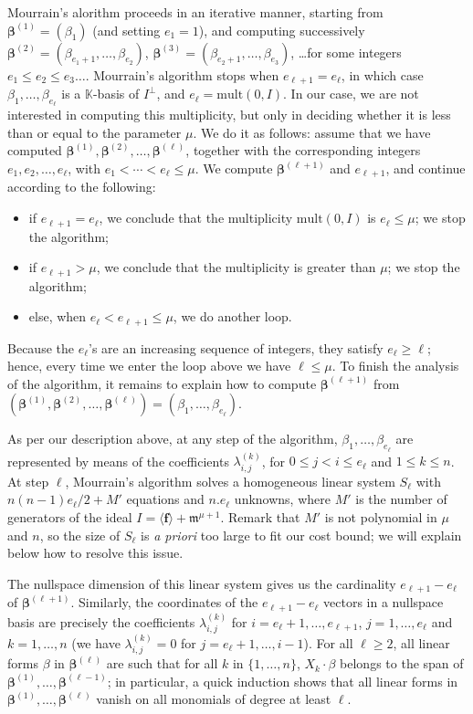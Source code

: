 \documentclass[11pt]{article}
\numberwithin{Property}{section}
\numberwithin{Theorem}{section}
\numberwithin{Proposition}{section}
\numberwithin{Lemma}{section}
\numberwithin{Corollary}{section}
\numberwithin{Definition}{section}
\numberwithin{Remark}{section}
\numberwithin{Conjecture}{section}
\numberwithin{Problem}{section}
\numberwithin{Claim}{section}
\theoremstyle{definition}
\numberwithin{Example}{section}
\def\mult{\ensuremath{\mathrm{mult}}}
\renewcommand{\le}{\leqslant}
\renewcommand{\ge}{\geqslant}
\renewcommand{\ge}{\geqslant} %
\renewcommand{\le}{\leqslant} %
\newcommand{\field}{\mathbb{K}} %
\begin{document}
Mourrain's alorithm proceeds in an iterative manner, starting from $\bm{\beta}^{(1)}=(\beta_{1})$ (and setting $e_1=1$), and computing successively $\bm{\beta}^{(2)}=(\beta_{e_1+1},\dots,\beta_{e_2})$, $\bm{\beta}^{(3)}=(\beta_{e_2+1},\dots,\beta_{e_3})$, \dots for some integers $e_1 \le e_2 \le e_3 \dots$. Mourrain's algorithm stops when $e_{\ell+1}=e_{\ell}$, in which case $\beta_1,\dots,\beta_{e_\ell}$ is a $\field$-basis of $I^\perp$, and $e_\ell=\mult(0,I)$. In our case, we are not interested in computing this multiplicity, but only in
deciding whether it is less than or equal to the parameter $\mu$. We do it as follows: assume that we have
computed $\bm{\beta}^{(1)},\bm{\beta}^{(2)},\dots,\bm{\beta}^{(\ell)}$, together with the corresponding integers $e_1,e_2,\dots,e_\ell$, with $e_1 < \cdots < e_\ell \le \mu$. We compute $\bm{\beta}^{(\ell+1)}$ and $e_{\ell+1}$, and continue according to the following:
\begin{itemize}
\item if $e_{\ell+1}=e_{\ell}$, we conclude that the multiplicity $\mult(0,I)$ is $e_\ell \le \mu$; we stop the algorithm;
\item if $e_{\ell+1} > \mu$, we conclude that the multiplicity is greater than $\mu$; we stop the algorithm;
\item else, when $e_\ell < e_{\ell+1} \le \mu$, we do another loop.
\end{itemize}
Because the $e_\ell$'s are an increasing sequence of integers, they satisfy $e_\ell \ge \ell$; hence, every time we enter the loop above we have $\ell \le \mu$. To finish the analysis of the algorithm, it remains to explain how to compute $\bm{\beta}^{(\ell+1)}$ from $(\bm{\beta}^{(1)},\bm{\beta}^{(2)},\dots,\bm{\beta}^{(\ell)})=(\beta_{1},\dots,\beta_{e_\ell})$.

As per our description above, at any step of the algorithm, $\beta_{1},\dots,\beta_{e_\ell}$ are represented by means of the coefficients $\lambda^{(k)}_{i,j}$, for $0 \le j < i \le e_{\ell}$ and $1 \le k \le n$.  At step $\ell$, Mourrain's algorithm solves a homogeneous linear system $S_\ell$ with $n(n-1) e_\ell/2+M'$ equations and $n.e_\ell$ unknowns, where $M'$ is the number of generators of the ideal $I= \langle \mathbf{f} \rangle + \mathfrak{m}^{\mu+1}$. Remark that $M'$ is not polynomial in $\mu$ and $n$, so the size of $S_\ell$ is {\em a priori} too large to fit our cost bound; we will explain below how to resolve this issue.

The nullspace dimension of this linear system gives us the cardinality $e_{\ell+1}-e_{\ell}$ of $\bm{\beta}^{(\ell +1)}$. Similarly, the coordinates of the $e_{\ell+1}-e_{\ell}$ vectors in a nullspace basis are precisely
the coefficients $\lambda^{(k)}_{i,j}$ for $i=e_{\ell}+1,\dots,e_{\ell+1}$, $j=1,\dots,e_\ell$ and $k=1,\dots,n$
(we have $\lambda^{(k)}_{i,j}=0$ for $j=e_{\ell}+1,\dots,i-1$). For all $\ell \ge 2$, all linear forms $\beta$ in $\bm{\beta}^{(\ell)}$ are such that for all $k$ in $\{1,\dots,n\}$, $X_k \cdot \beta$ belongs to the span of $\bm{\beta}^{(1)},\dots,\bm{\beta}^{(\ell-1)}$; in particular, a quick induction shows that all linear forms in $\bm{\beta}^{(1)},\dots,\bm{\beta}^{(\ell)}$ vanish on all monomials of degree at least $\ell$.
\end{document}
